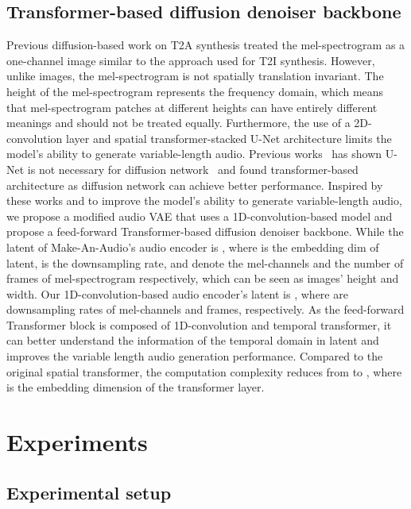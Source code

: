 \documentclass{article}
\begin{document}
\subsection{Transformer-based diffusion denoiser backbone}
\label{FFT}
Previous diffusion-based work on T2A synthesis treated the mel-spectrogram as a one-channel image similar to the approach used for T2I synthesis. However, unlike images, the mel-spectrogram is not spatially translation invariant. The height of the mel-spectrogram represents the frequency domain, which means that mel-spectrogram patches at different heights can have entirely different meanings and should not be treated equally. Furthermore, the use of a 2D-convolution layer and spatial transformer-stacked U-Net architecture limits the model's ability to generate variable-length audio. Previous works~\cite{dit,uvit} has shown U-Net is not necessary for diffusion network~\cite{ho2020denoising,rombach2022high} and found transformer-based~\cite{vaswani2017attention} architecture as diffusion network can achieve better performance. Inspired by these works and to improve the model's ability to generate variable-length audio, we propose a modified audio VAE that uses a 1D-convolution-based model and propose a feed-forward Transformer-based diffusion denoiser backbone. While the latent of Make-An-Audio's audio encoder is , where  is the embedding dim of latent,  is the downsampling rate,  and  denote the mel-channels and the number of frames of mel-spectrogram respectively, which can be seen as images' height and width. Our 1D-convolution-based audio encoder's latent is  , where  are downsampling rates of mel-channels and frames, respectively. 
As the feed-forward Transformer block is composed of 1D-convolution and temporal transformer, it can better understand the information of the temporal domain in latent and improves the variable length audio generation performance. Compared to the original spatial transformer, the computation complexity reduces from  to , where  is the embedding dimension of the transformer layer. 





 \section{Experiments}

\subsection{Experimental setup}
\end{document}
